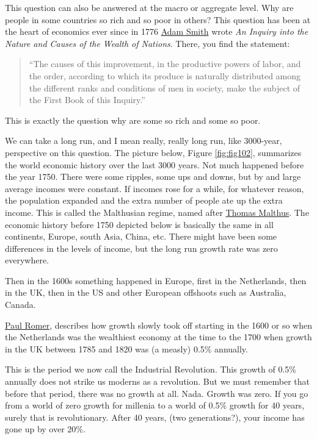 \documentclass[
]{book}
\begin{document}
This question can also be answered at the macro or aggregate level. Why are people in some countries so rich and so poor in others? This question has been at the heart of economics ever since in 1776 \href{https://en.wikipedia.org/wiki/Adam_Smith}{Adam Smith} wrote \emph{An Inquiry into the Nature and Causes of the Wealth of Nations}. There, you find the statement:

\begin{quote}
``The causes of this improvement, in the productive powers of labor, and the order, according to which its produce is naturally distributed among the different ranks and conditions of men in society, make the subject of the First Book of this Inquiry.''
\end{quote}

This is exactly the question why are some so rich and some so poor.

We can take a long run, and I mean really, really long run, like 3000-year, perspective on this question. The picture below, Figure \ref{fig:fig102}, summarizes the world economic history over the last 3000 years. Not much happened before the year 1750. There were some ripples, some ups and downs, but by and large average incomes were constant. If incomes rose for a while, for whatever reason, the population expanded and the extra number of people ate up the extra income. This is called the Malthusian regime, named after \href{https://en.wikipedia.org/wiki/Thomas_Robert_Malthus}{Thomas Malthus}. The economic history before 1750 depicted below is basically the same in all continents, Europe, south Asia, China, etc. There might have been some differences in the levels of income, but the long run growth rate was zero everywhere.

Then in the 1600s something happened in Europe, first in the Netherlands, then in the UK, then in the US and other European offshoots such as Australia, Canada.

\href{https://en.wikipedia.org/wiki/Paul_Romer}{Paul Romer}, describes how growth slowly took off starting in the 1600 or so when the Netherlands was the wealthiest economy at the time to the 1700 when growth in the UK between 1785 and 1820 was (a measly) 0.5\% annually.

This is the period we now call the Industrial Revolution. This growth of 0.5\% annually does not strike us moderns as a revolution. But we must remember that before that period, there was no growth at all. Nada. Growth was zero. If you go from a world of zero growth for millenia to a world of 0.5\% growth for 40 years, surely that is revolutionary. After 40 years, (two generations?), your income has gone up by over 20\%.
\end{document}
